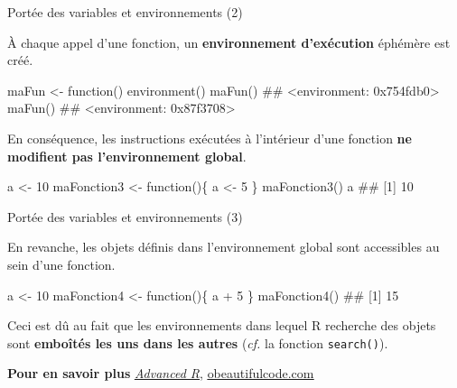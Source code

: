 \documentclass[12pt,handout,ignorenonframetext,]{beamer}
\newenvironment{Shaded}{}{}
\newcommand{\KeywordTok}[1]{\textcolor[rgb]{0.00,0.00,1.00}{{#1}}}
\newcommand{\DecValTok}[1]{{#1}}
\newcommand{\StringTok}[1]{\textcolor[rgb]{0.00,0.50,0.50}{{#1}}}
\newcommand{\NormalTok}[1]{{#1}}
\renewenvironment{Shaded}{\begin{snugshade}}{\end{snugshade}}
\begin{document}
\begin{frame}[fragile]{\large Portée des variables et environnements
(2)}

\small
À chaque appel d'une fonction, un \textbf{environnement d'exécution}
éphémère est créé.

\footnotesize

\begin{Shaded}
\begin{Highlighting}[]
\NormalTok{maFun <-}\StringTok{ }\NormalTok{function() }\KeywordTok{environment}\NormalTok{()}
\KeywordTok{maFun}\NormalTok{()}
  \NormalTok{## <environment: 0x754fdb0>}
\KeywordTok{maFun}\NormalTok{()}
  \NormalTok{## <environment: 0x87f3708>}
\end{Highlighting}
\end{Shaded}

\pause \small
En conséquence, les instructions exécutées à l'intérieur d'une fonction
\textbf{ne modifient pas l'environnement global}.

\footnotesize

\begin{Shaded}
\begin{Highlighting}[]
\NormalTok{a <-}\StringTok{ }\DecValTok{10}
\NormalTok{maFonction3 <-}\StringTok{ }\NormalTok{function()\{}
  \NormalTok{a <-}\StringTok{ }\DecValTok{5}
\NormalTok{\}}
\KeywordTok{maFonction3}\NormalTok{()}
\NormalTok{a}
  \NormalTok{## [1] 10}
\end{Highlighting}
\end{Shaded}

\end{frame}

\begin{frame}[fragile]{\large Portée des variables et environnements
(3)}

En revanche, les objets définis dans l'environnement global sont
accessibles au sein d'une fonction.

\footnotesize

\begin{Shaded}
\begin{Highlighting}[]
\NormalTok{a <-}\StringTok{ }\DecValTok{10}
\NormalTok{maFonction4 <-}\StringTok{ }\NormalTok{function()\{}
  \NormalTok{a +}\StringTok{ }\DecValTok{5}
\NormalTok{\}}
\KeywordTok{maFonction4}\NormalTok{()}
  \NormalTok{## [1] 15}
\end{Highlighting}
\end{Shaded}

\pause \normalsize
Ceci est dû au fait que les environnements dans lequel R recherche des
objets sont \textbf{emboîtés les uns dans les autres} (\textit{cf.} la
fonction \texttt{search()}).

\textbf{Pour en savoir plus}
\href{http://adv-r.had.co.nz/Environments.html\#function-envs}{\underline{\textit{Advanced R}}},
\href{http://blog.obeautifulcode.com/R/How-R-Searches-And-Finds-Stuff/}{\underline{obeautifulcode.com}}

\end{frame}
\end{document}
